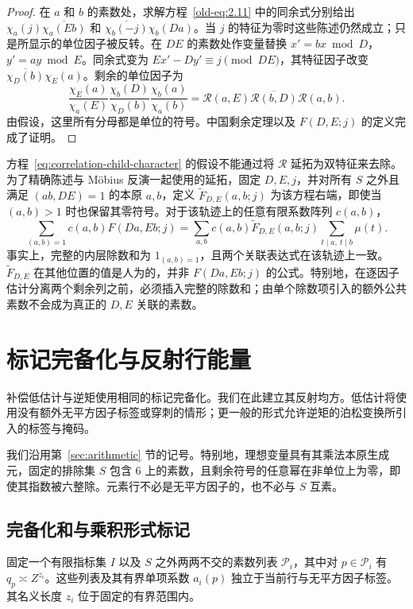 \documentclass[11pt,a4paper]{article}
\numberwithin{equation}{section}
\numberwithin{figure}{section}
\theoremstyle{definition}
\theoremstyle{remark}
\begin{document}
\begin{proof}
在 $a$ 和 $b$ 的素数处，求解方程~\eqref{old-eq:2.11} 中的同余式分别给出
$\chi_a(j)\overline{\chi_a(Eb)}$ 和
$\overline{\chi_b(-j)}\chi_b(Da)$。当 $j$ 的特征为零时这些陈述仍然成立；只是所显示的单位因子被反转。在 $DE$ 的素数处作变量替换 $x'=bx\bmod D$，$y'=ay\bmod E$。同余式变为 $Ex'-Dy'\equiv j\pmod{DE}$，其特征因子改变 $\overline{\chi_D(b)}\chi_E(a)$。剩余的单位因子为
\[
 \frac{\chi_E(a)}{\chi_a(E)}
 \frac{\chi_b(D)}{\chi_D(b)}
 \frac{\chi_b(a)}{\chi_a(b)}
 =\mathcal R(a,E)\overline{\mathcal R(b,D)}\mathcal R(a,b).
\]
由假设，这里所有分母都是单位的符号。中国剩余定理以及 $F(D,E;j)$ 的定义完成了证明。
\end{proof}方程~\eqref{eq:correlation-child-character} 的假设不能通过将 $\mathcal R$ 延拓为双特征来去除。为了精确陈述与 M\"obius 反演一起使用的延拓，固定 $D,E,j$，并对所有 $S$ 之外且满足 $(ab,DE)=1$ 的本原 $a,b$，定义 $\widetilde F_{D,E}(a,b;j)$ 为该方程右端，即使当 $(a,b)>1$ 时也保留其零符号。对于该轨迹上的任意有限系数阵列 $c(a,b)$，
\[
 \sum_{(a,b)=1}c(a,b)F(Da,Eb;j)
 =\sum_{a,b}c(a,b)\widetilde F_{D,E}(a,b;j)
                \sum_{t\mid a,\ t\mid b}\mu(t).
\]
事实上，完整的内层除数和为 $1_{(a,b)=1}$，且两个关联表达式在该轨迹上一致。$\widetilde F_{D,E}$ 在其他位置的值是人为的，并非 $F(Da,Eb;j)$ 的公式。特别地，在逐因子估计分离两个剩余列之前，必须插入完整的除数和；由单个除数项引入的额外公共素数不会成为真正的 $D,E$ 关联的素数。

\section{标记完备化与反射行能量}
\label{sec:marked}\label{sec:marked-energy}

补偿低估计与逆矩使用相同的标记完备化。我们在此建立其反射均方。低估计将使用没有额外无平方因子标签或穿刺的情形；更一般的形式允许逆矩的泊松变换所引入的标签与掩码。

我们沿用第~\ref{sec:arithmetic} 节的记号。特别地，理想变量具有其乘法本原生成元，固定的排除集 \(S\) 包含 \(6\) 上的素数，且剩余符号的任意幂在非单位上为零，即使其指数被六整除。元素行不必是无平方因子的，也不必与 \(S\) 互素。

\subsection{完备化和与乘积形式标记}

固定一个有限指标集 \(I\) 以及 \(S\) 之外两两不交的素数列表
\(\mathcal P_i\)，其中对 \(p\in\mathcal P_i\) 有
\(q_p\asymp Z^{z_i}\)。这些列表及其有界单项系数 \(a_i(p)\) 独立于当前行与无平方因子标签。其名义长度 \(z_i\) 位于固定的有界范围内。
\end{document}
